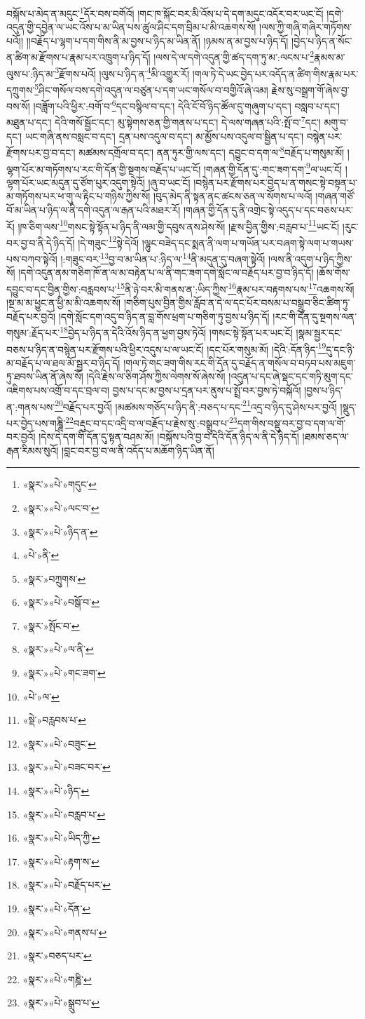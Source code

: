 བསྐོས་པ་མེད་ན་མདུང་\footnote{«སྣར་»«པེ་»གདུང་}དོར་བས་བགོའོ། །གང་ཁ་སྐོང་བར་མི་འོས་པ་དེ་དག་མདུང་འདོར་བར་ཡང་ངོ། །དགེ་འདུན་གྱི་དབྱེན་ལ་ཡང་འོས་པ་མ་ཡིན་པས་ཚུལ་ཤིང་དག་བྲིམ་པ་མི་འཆགས་སོ། །ལས་ཀྱི་གཞི་གཞིར་གཏོགས་པའོ།། །།བརྗོད་པ་ལྷག་པ་དག་གིས་ནི་མ་བྱས་པ་ཉིད་མ་ཡིན་ནོ། །ཉམས་ན་མ་བྱས་པ་ཉིད་དོ། །བྱེད་པ་ཉིད་ན་སོང་ན་ཚིག་མ་རྫོགས་པ་རྣམ་པར་འཁྲུག་པ་ཉིད་དོ། །ལས་དེ་ལ་དགེ་འདུན་གྱི་ཚད་དག་ཏུ་མ་:ལངས་པ་\footnote{«སྣར་»«པེ་»ལང་བ་}རྣམས་མ་ལུས་པ་:ཉིད་མ་\footnote{«སྣར་»«པེ་»ཉིད་ན་}རྫོགས་པའོ། །ལུས་པ་ཉིད་ན་\footnote{«པེ་»ནི་}མི་འགྱུར་རོ། །གལ་ཏེ་དེ་ཡང་བྱེད་པར་འདོད་ན་ཚིག་གིས་རྣམ་པར་དཀྲུགས་\footnote{«སྣར་»བཀྲུགས་}ཤིང་གསོལ་བས་དགེ་འདུན་ལ་བཙུན་པ་དག་ཡང་གསོལ་བ་བགྱིའོ་ཞེ་འམ། རྗེས་སུ་བསྒྲག་གོ་ཞེས་བྱ་བས་སོ། །བཟློག་པའི་ཕྱིར་:བགོ་བ་\footnote{«སྣར་»«པེ་»བསྒོ་བ་}དང་བསྙིལ་བ་དང་། དེའི་ངོ་བོ་ཉིད་ཚོལ་དུ་གཞུག་པ་དང་། བསླབ་པ་དང་། མཐུན་པ་དང་། དེའི་གསོ་སྦྱོང་དང་། མུ་སྟེགས་ཅན་གྱི་གནས་པ་དང་། དེ་ལས་གཞན་པའི་:སྤོ་བ་\footnote{«སྣར་»སྤོང་བ་}དང་། མགུ་བ་དང་། ཡང་གཞི་ནས་བསླང་བ་དང་། དྲན་པས་འདུལ་བ་དང་། མ་མྱོས་པས་འདུལ་བ་སྦྱིན་པ་དང་། བསྙེན་པར་རྫོགས་པར་བྱ་བ་དང་། མཚམས་དགྲོལ་བ་དང་། ནན་ཏུར་གྱི་ལས་དང་། དབྱུང་བ་དག་ལ་\footnote{«སྣར་»«པེ་»ལ་ནི་}བརྗོད་པ་གསུམ་མོ། །ལྷག་པོར་མ་གཏོགས་པ་རང་གི་དོན་གྱི་སྔགས་བརྗོད་པ་ཡང་ངོ། །གཞན་གྱི་དོན་དུ་:གང་ཟག་དག་\footnote{«སྣར་»«པེ་»གང་ཟག་}ལ་ཡང་ངོ། །ལྷག་པོར་ཡང་མདུན་དུ་ཙོག་པུར་འདུག་སྟེའོ། །ཞུ་བ་ཡང་ངོ། །བསྙེན་པར་རྫོགས་པར་བྱེད་པ་ན་གསང་སྟེ་བསྟན་པ་མ་གཏོགས་པར་ཕ་གུ་ལ་རྟིང་པ་གཉིས་ཀྱིས་སོ། །བུད་མེད་ནི་སྟན་ནང་ཚངས་ཅན་ལ་སོགས་པ་ལའོ། །གཞན་གཙོ་བོ་མ་ཡིན་པ་ཉིད་ལ་ནི་དགེ་འདུན་ལ་རྒན་པའི་མཐར་རོ། །གཞན་གྱི་དོན་དུ་ནི་འགྲེང་སྟེ་འདུད་པ་དང་བཅས་པར་རོ། །ཁ་ཅིག་ལས་\footnote{«པེ་»ལ་}གསང་སྟེ་སྟོན་པ་ཉིད་ནི་ལམ་གྱི་དབུས་ནས་ཤེས་སོ། །རྫས་བྱིན་གྱིས་:བརླབ་པ་\footnote{«སྡེ་»བརླབས་པ་}ཡང་ངོ། །རུང་བར་བྱ་བ་ནི་དེ་ཉིད་དོ། །དེ་གཟུང་\footnote{«སྣར་»«པེ་»བཟུང་}སྟེ་དེའོ། །ལྷུང་བཟེད་དང་སྨན་ནི་ལག་པ་གཡོན་པར་བཞག་སྟེ་ལག་པ་གཡས་པས་བཀབ་སྟེའོ། །:གཟུང་བར་\footnote{«སྣར་»«པེ་»བཟང་བར་}བྱ་བ་མ་ཡིན་པ་:ཉིད་ལ་\footnote{«སྣར་»«པེ་»ཉིད་}ནི་མདུན་དུ་བཞག་སྟེའོ། །ལས་ནི་འདུག་པ་ཉིད་ཀྱིས་སོ། །དགེ་འདུན་ནམ་གཅིག་ཁོ་ན་ལ་མ་བརྟེན་པ་ལ་ནི་གང་ཟག་དགེ་སློང་ལ་བརྗོད་པར་བྱ་བ་ཉིད་དོ། །ཆོས་གོས་དབྱུང་བ་དང་བྱིན་གྱིས་:བརླབས་པ་\footnote{«སྣར་»«པེ་»བརླབ་པ་}ནི་ཉེ་བར་མི་གནས་ན་:ཡིད་ཀྱིས་\footnote{«སྣར་»«པེ་»ཡིད་ཀྱི་}རྣམ་པར་བརྟགས་པས་\footnote{«སྣར་»«པེ་»རྟག་ས་}འཆགས་སོ། །སྔ་མ་མ་ཕྱུང་ན་ཕྱི་མ་མི་འཆགས་སོ། །གཅིག་པུས་བྱིན་གྱིས་རློབ་ན་དེ་ལ་དང་པོར་བསམ་པ་བསྒྲུབ་ཅིང་ཚིག་ཏུ་བརྗོད་པར་བྱའོ། །དགེ་སློང་དག་འདུ་བ་ཉིད་ན་བླ་གོས་ཕྲག་པ་གཅིག་ཏུ་བྱས་པ་ཉིད་དོ། །རང་གི་དོན་དུ་སྔགས་ལན་གསུམ་:རྗོད་པར་\footnote{«སྣར་»«པེ་»བརྗོད་པར་}བྱེད་པ་ཉིད་ན་དེའི་འོས་ཉིད་ན་ཕྱག་བྱས་ཏེའོ། །གསང་སྟེ་སྟོན་པར་ཡང་ངོ། །སྣམ་སྦྱར་དང་བཅས་པ་ཉིད་ན་བསྙེན་པར་རྫོགས་པའི་ཕྱིར་འདུས་པ་ལ་ཡང་ངོ། །དང་པོར་གསུམ་མོ། །དེའི་:དོན་ཉིད་\footnote{«སྣར་»«པེ་»དོན་}དུ་དང་ཉི་མ་བརྗོད་པ་ལ་ཐལ་མོ་སྦྱར་བ་ཉིད་དོ། །གལ་ཏེ་གང་ཟག་གིས་རང་གི་དོན་དུ་བརྗོད་ན་གསོལ་བ་བཏབ་པས་མཇུག་ཏུ་ཐབས་ཡིན་ནོ་ཞེས་སོ། །དེའི་རྗེས་ལ་ཅིག་ཤོས་ཀྱིས་ལེགས་སོ་ཞེས་སོ། །འདུན་པ་དང་ཞེ་སྡང་དང་གཏི་མུག་དང་འཇིགས་པས་འགྲོ་བ་དང་བྲལ་བ། བྱས་པ་དང་མ་བྱས་པ་དྲན་པར་ནུས་པ་སྤྲོ་བར་བྱས་ཏེ་བསྐོའོ། །བྱས་པ་ཉིད་ན་:གནས་པས་\footnote{«སྣར་»«པེ་»གནས་པ་}བརྗོད་པར་བྱའོ། །མཚམས་གཅོད་པ་ཉིད་ནི་:བཅད་པ་དང་\footnote{«སྣར་»བཅད་པར་}འདྲ་བ་ཉིད་དུ་ཤེས་པར་བྱའོ། །སྡུད་པར་བྱེད་པས་གཎྜཱི་\footnote{«སྣར་»«པེ་»གཎྜི་}བརྡུང་བ་དང་འདྲི་བ་ལ་བརྗོད་པ་རྗེས་སུ་:བསྒྲུབ་པ་\footnote{«སྣར་»«པེ་»སྒྲུབ་པ་}དག་གིས་བསྡུ་བར་བྱ་བ་དག་ལ་གོ་བར་བྱའོ། །དེས་དེ་དག་གི་དོན་དུ་སྟན་བཤམ་མོ། །བསྐོས་པའི་བྱ་བ་དེའི་དོན་ཉིད་ལ་ནི་དེ་ཉིད་དོ། །ཐམས་ཅད་ལ་རྒན་རིམས་སུའོ། །བླང་བར་བྱ་བ་ལ་ནི་འདོད་པ་མཆོག་ཉིད་ཡིན་ནོ། 